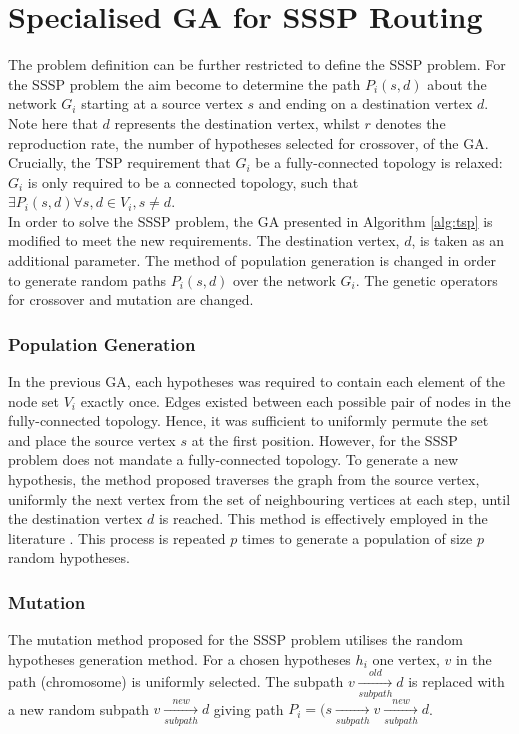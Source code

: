 \documentclass[
	a4paper, %
	10pt, %
	unnumberedsections, %
	twoside, %
]{LTJournalArticle}
\begin{document}
\section{Specialised GA for SSSP Routing}

The problem definition can be further restricted to define the SSSP problem. For the SSSP problem the aim become to determine the path \(P_{i} (s, d)\) about the network \(G_{i}\) starting at a source vertex \(s\) and ending on a destination vertex \(d\). Note here that \(d\) represents the destination vertex, whilst \(r\) denotes the reproduction rate, the number of hypotheses selected for crossover, of the GA. Crucially, the TSP requirement that \(G_{i}\) be a fully-connected topology is relaxed: \(G_{i}\) is only required to be a connected topology, such that \(\exists P_{i}(s, d) \forall s, d \in V_{i}, s \neq d\). \\

In order to solve the SSSP problem, the GA presented in Algorithm \ref{alg:tsp} is modified to meet the new requirements. The destination vertex, \(d\), is taken as an additional parameter. The method of population generation is changed in order to generate random paths \(P_{i} (s, d)\) over the network \(G_{i}\). The genetic operators for crossover and mutation are changed. \\

\subsubsection{Population Generation} In the previous GA, each hypotheses was required to contain each element of the node set \(V_{i}\) exactly once. Edges existed between each possible pair of nodes in the fully-connected topology. Hence, it was sufficient to uniformly permute the set and place the source vertex \(s\) at the first position. However, for the SSSP problem does not mandate a fully-connected topology.
To generate a new hypothesis, the method proposed traverses the graph from the source vertex, uniformly the next vertex from the set of neighbouring vertices at each step, until the destination vertex \(d\) is reached. This method is effectively employed in the literature \cite{yang:10} \cite{yussof:09} \cite{kumar:10}. This process is repeated \(p\) times to generate a population of size \(p\) random hypotheses. 

\subsubsection{Mutation} The mutation method proposed for the SSSP problem utilises the random hypotheses generation method. For a chosen hypotheses \(h_{i}\) one vertex, \(v\) in the path (chromosome) is uniformly selected. The subpath \(v \xrightarrow[subpath]{old} d\) is replaced with a new random subpath \(v \xrightarrow[subpath]{new} d\) giving path \(P_{i} = (s \xrightarrow[subpath]{} v \xrightarrow[subpath]{new} d\).  \\
\end{document}
